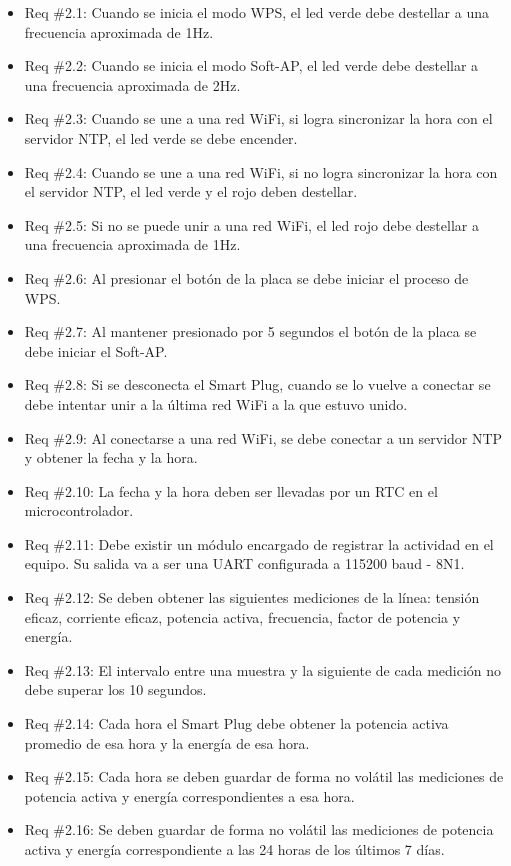 \begin{itemize}
\begin{itemize}
\item Req \#2.1: Cuando se inicia el modo WPS, el led verde debe destellar a una frecuencia aproximada de 1Hz.
\item Req \#2.2: Cuando se inicia el modo Soft-AP, el led verde debe destellar a una frecuencia aproximada de 2Hz.
\item Req \#2.3: Cuando se une a una red WiFi, si logra sincronizar la hora con el servidor NTP, el led verde se debe encender.
\item Req \#2.4: Cuando se une a una red WiFi, si no logra sincronizar la hora con el servidor NTP, el led verde y el rojo deben destellar.
\item Req \#2.5: Si no se puede unir a una red WiFi, el led rojo debe destellar a una frecuencia aproximada de 1Hz.
\item Req \#2.6: Al presionar el botón de la placa se debe iniciar el proceso de WPS.
\item Req \#2.7: Al mantener presionado por 5 segundos el botón de la placa se debe iniciar el Soft-AP.
\item Req \#2.8: Si se desconecta el Smart Plug, cuando se lo vuelve a conectar se debe intentar unir a la última red WiFi a la que estuvo unido.
\item Req \#2.9: Al conectarse a una red WiFi, se debe conectar a un servidor NTP y obtener la fecha y la hora.
\item Req \#2.10: La fecha y la hora deben ser llevadas por un RTC en el microcontrolador.
\item Req \#2.11: Debe existir un módulo encargado de registrar la actividad en el equipo. Su salida va a ser una UART configurada a 115200 baud - 8N1.
\item Req \#2.12: Se deben obtener las siguientes mediciones de la línea: tensión eficaz, corriente eficaz, potencia activa, frecuencia, factor de potencia y energía. 
\item Req \#2.13: El intervalo entre una muestra y la siguiente de cada medición no debe superar los 10 segundos.
\item Req \#2.14: Cada hora el Smart Plug debe obtener la potencia activa promedio de esa hora y la energía de esa hora.
\item Req \#2.15: Cada hora se deben guardar de forma no volátil las mediciones de potencia activa y energía correspondientes a esa hora.
\item Req \#2.16: Se deben guardar de forma no volátil las mediciones de potencia activa y energía correspondiente a las 24 horas de los últimos 7 días.

\end{itemize}
\end{itemize}
